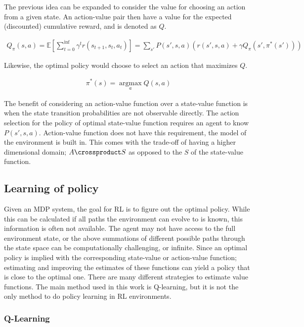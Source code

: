 \documentclass[../dissertation.tex]{subfiles}
\begin{document}
The previous idea can be expanded to consider the value for choosing an action from a given state.
An action-value pair then have a value for the expected (discounted) cumulative reward, and is denoted as $Q$.

\begin{align}
    \label{eqn:action-value}
    Q_\pi(s, a) = \mathbb{E} \left[
        \sum_{t=0}^{\inf} \gamma^{t} r(s_{t+1}, s_t, a_t)
    \right]
    =   \sum_{s'} P(s', s, a) \left( r(s', s, a) + \gamma Q_{\pi}(s', \pi^*(s')) \right)
\end{align}

Likewise, the optimal policy would choose to select an action that maximizes $Q$.

\begin{align}
    \label{eqn:action-optQ}
    \pi^*(s) = \operatorname*{argmax}_a Q(s, a) 
\end{align}

The benefit of considering an action-value function over a state-value function is when the state transition probabilities are not observable directly.
The action selection for the policy of optimal state-value function requires an agent to know $P(s', s, a)$.
Action-value function does not have this requirement, the model of the environment is built in.
This comes with the trade-off of having a higher dimensional domain; $A \crossproduct S$ as opposed to the $S$ of the state-value function.

\subsection{Learning of policy}

Given an MDP system, the goal for RL is to figure out the optimal policy.
While this can be calculated if all paths the environment can evolve to is known, this information is often not available.
The agent may not have access to the full environment state, or the above summations of different possible paths through the state space can be computationally challenging, or infinite.
Since an optimal policy is implied with the corresponding state-value or action-value function; estimating and improving the estimates of these functions can yield a policy that is close to the optimal one.
There are many different strategies to estimate value functions.
The main method used in this work is Q-learning, but it is not the only method to do policy learning in RL environments.

\subsubsection{Q-Learning}
\end{document}
